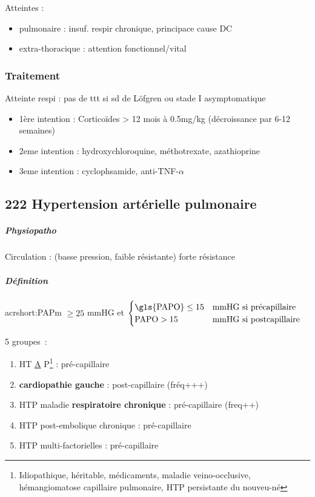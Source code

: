 \documentclass[11pt]{article}
\begin{document}
Atteintes :

\begin{itemize}
\item pulmonaire : insuf. respir chronique, principace cause DC
\item extra-thoracique : attention fonctionnel/vital
\end{itemize}


\subsubsection{Traitement}
\label{sec:org33db1b0}
\label{sec:orgc05b9f6}
Atteinte respi : pas de ttt si sd de Löfgren ou stade I asymptomatique\\

\begin{itemize}
\item 1ère intention : Corticoïdes > 12 mois à 0.5mg/kg (décroissance par 6-12 semaines)
\item 2eme intention : hydroxychloroquine, méthotrexate, azathioprine
\item 3eme intention : cyclophsamide, anti-TNF-\(\alpha\)
\end{itemize}

\subsection{222 \textdagger{} Hypertension artérielle pulmonaire}
\label{sec:orgf659f4e}

\subparagraph{Physiopatho}
\label{sec:org3b54a24}
Circulation : (basse pression, faible résistante) \thus forte résistance

\subparagraph{Définition}
\label{sec:org650575f}
acrshort:PAPm \(\ge 25\) mmHG et
$\begin{cases}
  \text{\gls{PAPO}} \le 15 & \text{mmHG si précapillaire} \\
  \text{PAPO} > 15 & \text{mmHG si postcapillaire}
\end{cases}$

5 groupes :
\begin{enumerate}
\item HT \uline{A} P\footnote{Idiopathique, héritable, médicaments, maladie veino-occlusive, hémangiomatose capillaire
pulmonaire, HTP persistante du nouveu-né} :  pré-capillaire
\item \textbf{cardiopathie gauche}  : post-capillaire (fréq+++)
\item HTP maladie \textbf{respiratoire chronique}  : pré-capillaire (freq++)
\item HTP post-embolique chronique : pré-capillaire
\item HTP multi-factorielles : pré-capillaire
\end{enumerate}
\end{document}

